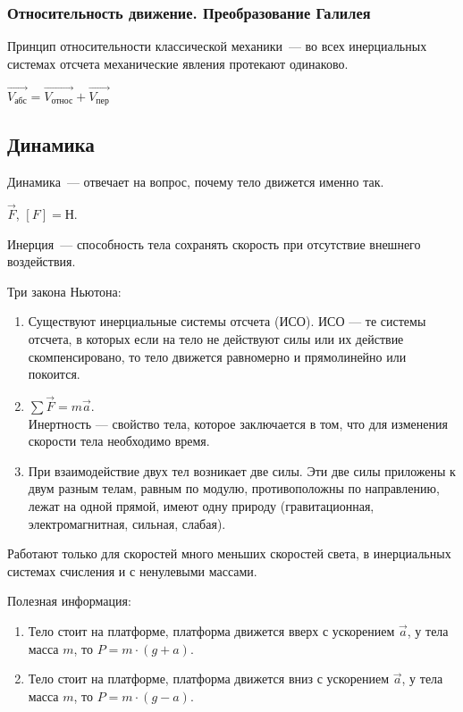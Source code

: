 \documentclass[12pt]{article}
\begin{document}
	\subsubsection{Относительность движение. Преобразование Галилея}
	\begin{definition}
		Принцип относительности классической механики~--- во всех инерциальных системах отсчета механические явления протекают одинаково.
	\end{definition}
	\noindent
	$\vec{V_{\text{абс}}} = \vec{V_{\text{относ}}} + \vec{V_{\text{пер}}}$
	\subsection{Динамика}
	\begin{definition}
		Динамика~--- отвечает на вопрос, почему тело движется именно так.
	\end{definition}
	\noindent
	$\vec{F}$, $[F] = \text{Н}$.
	\begin{definition}
		Инерция~--- способность тела сохранять скорость при отсутствие внешнего воздействия.
	\end{definition}
	\begin{definition}
		Три закона Ньютона:
		\begin{enumerate}[1.]
			\item Существуют инерциальные системы отсчета (ИСО). ИСО --- те системы отсчета, в которых если на тело не действуют силы или их действие скомпенсировано, то тело движется равномерно и прямолинейно или покоится.
			\item $\sum\vec{F} = m\vec{a}$.\\
			Инертность --- свойство тела, которое заключается в том, что для изменения скорости тела необходимо время.
			\item При взаимодействие двух тел возникает две силы. Эти две силы приложены к двум разным телам, равным по модулю, противоположны по направлению, лежат на одной прямой, имеют одну природу (гравитационная, электромагнитная, сильная, слабая).
		\end{enumerate}
	\end{definition}
	\begin{statement}
		Работают только для скоростей много меньших скоростей света, в инерциальных системах счисления и с ненулевыми массами.
	\end{statement}
	\begin{statement}
		Полезная информация:
		\begin{enumerate}
			\item Тело стоит на платформе, платформа движется вверх с ускорением $\vec{a}$, у тела масса $m$, то $P = m \cdot (g + a)$.
			\item Тело стоит на платформе, платформа движется вниз с ускорением $\vec{a}$, у тела масса $m$, то $P = m \cdot (g - a)$.
		\end{enumerate}
	\end{statement}
\end{document}
